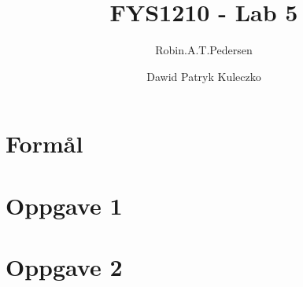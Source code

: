 \documentclass{article}
\begin{document}
\title{FYS1210 - Lab 5}
\author{Robin.A.T.Pedersen \and Dawid Patryk Kuleczko}
\maketitle

\section{Formål}


\section{Oppgave 1}


\section{Oppgave 2}

\end{document}
